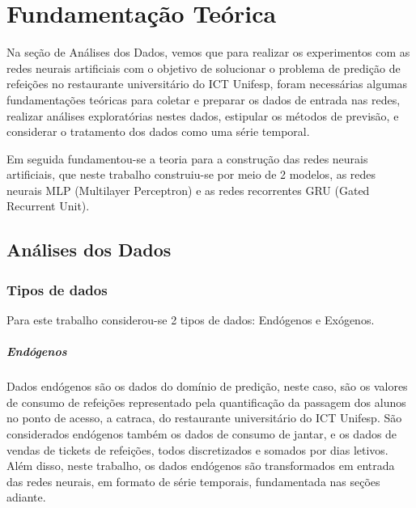 \documentclass[	12pt, Times, openright, twoside, a4paper, english, brazil]{abntex2}
\begin{document}
  \chapter{Fundamentação Teórica}
  
      Na seção de Análises dos Dados, vemos que para realizar os experimentos com as redes neurais artificiais com o objetivo de solucionar o problema de predição de refeições no restaurante universitário do ICT Unifesp, foram necessárias algumas fundamentações teóricas para coletar e preparar os dados de entrada nas redes, realizar análises exploratórias nestes dados, estipular os métodos de previsão, e considerar o tratamento dos dados como uma série temporal.
      
      Em seguida fundamentou-se a teoria para a construção das redes neurais artificiais, que neste trabalho construiu-se por meio de 2 modelos, as redes neurais MLP (Multilayer Perceptron) e as redes recorrentes GRU (Gated Recurrent Unit).

      \section{Análises dos Dados}
        \subsection{Tipos de dados}
            Para este trabalho considerou-se 2 tipos de dados: Endógenos e Exógenos.
            \paragraph{Endógenos}
            Dados endógenos são os dados do domínio de predição, neste caso, são os valores de consumo de refeições representado pela quantificação da passagem dos alunos no ponto de acesso, a catraca, do restaurante universitário do ICT Unifesp.
            São considerados endógenos também os dados de consumo de jantar, e os dados de vendas de tickets de refeições, todos discretizados e somados por dias letivos. Além disso, neste trabalho, os dados endógenos são transformados em entrada das redes neurais, em formato de série temporais, fundamentada nas seções adiante.
            
\end{document}

